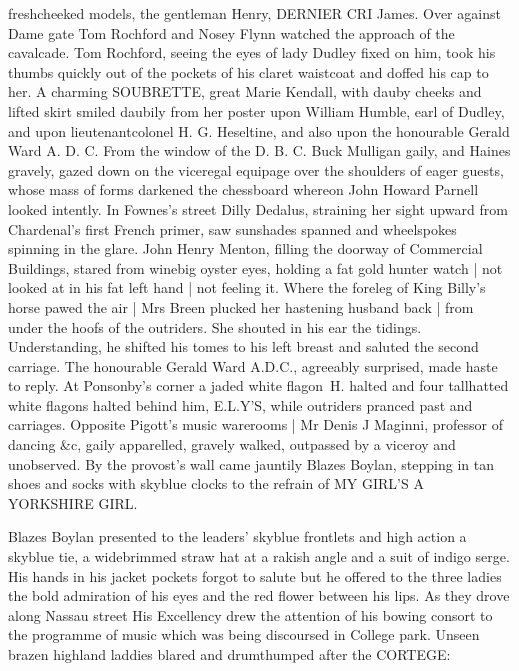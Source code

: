 freshcheeked models, the gentleman Henry, DERNIER CRI James. Over against
Dame gate Tom Rochford and Nosey Flynn watched the approach of the
cavalcade. Tom Rochford, seeing the eyes of lady Dudley fixed on him,
took his thumbs quickly out of the pockets of his claret waistcoat and
doffed his cap to her.
A charming SOUBRETTE, great Marie Kendall, with
dauby cheeks and lifted skirt smiled daubily from her poster upon William
Humble, earl of Dudley, and upon lieutenantcolonel H. G. Heseltine, and
also upon the honourable Gerald Ward A. D. C. From the window of the
D. B. C. Buck Mulligan gaily, and Haines gravely, gazed down on the
viceregal equipage over the shoulders of eager guests, whose mass of forms
darkened the chessboard whereon John Howard Parnell looked intently. In
Fownes's street Dilly Dedalus, straining her sight upward from
Chardenal's first French primer, saw sunshades spanned and wheelspokes
spinning in the glare.
John Henry Menton,
filling the doorway of Commercial Buildings,
stared from winebig oyster eyes,
holding a fat gold hunter watch |
not looked at in his fat left hand |
not feeling it.
Where the foreleg of King Billy's horse pawed the air |
Mrs Breen plucked her hastening husband back |
from under the hoofs of the outriders.
She shouted in his ear the tidings.
Understanding, he shifted his tomes to his left
breast and saluted the second carriage. The honourable Gerald Ward A.D.C.,
agreeably surprised, made haste to reply. At Ponsonby's corner a jaded
white flagon~H. halted and four tallhatted white flagons halted behind
him, E.L.Y'S, while outriders pranced past and carriages.
Opposite Pigott's music warerooms |
Mr Denis J Maginni, professor of dancing \&c,
gaily apparelled, gravely walked,
outpassed by a viceroy and unobserved.
By the provost's wall came jauntily Blazes Boylan, stepping in tan shoes
and socks with skyblue clocks to the refrain of
MY GIRL'S A YORKSHIRE GIRL.

Blazes Boylan presented to the leaders' skyblue frontlets and high
action a skyblue tie, a widebrimmed straw hat at a rakish angle and a suit
of indigo serge. His hands in his jacket pockets forgot to salute but he
offered to the three ladies the bold admiration of his eyes and the red
flower between his lips. As they drove along Nassau street His Excellency
drew the attention of his bowing consort to the programme of music which
was being discoursed in College park. Unseen brazen highland laddies
blared and drumthumped after the CORTEGE:%


